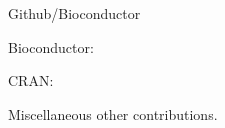 \begin{cventries}

\cventry 
{Github/Bioconductor}
{}
{}
{}
{
  \begin{cvitems}
    \item {
      Bioconductor:
        
    }
    \item {
      CRAN:
        
    }
    \item {
      Miscellaneous other contributions.
    }
  \end{cvitems}
}
\end{cventries}
